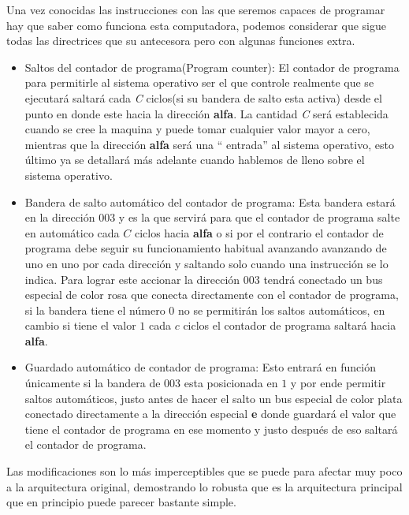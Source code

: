 \documentclass[12pt]{article}
\begin{document}
	Una vez conocidas las instrucciones con las que seremos capaces de programar hay que saber como funciona esta computadora, podemos
	considerar que sigue todas las directrices que su antecesora pero con algunas funciones extra.
	
	\begin{itemize}
		\item Saltos del contador de programa(Program counter):  
			El contador de programa para permitirle al sistema operativo ser el que controle realmente que se ejecutará saltará
			cada \textit{C} ciclos(si su bandera de salto esta activa) desde el punto en donde este hacia la dirección \textbf{alfa}.
			La cantidad \textit{C} será establecida cuando se cree la maquina y puede tomar cualquier valor mayor a cero, mientras
			que la dirección \textbf{alfa} será una `` entrada'' al sistema operativo, esto último ya se detallará más adelante
			cuando hablemos de lleno sobre el sistema operativo.
		
		\item Bandera de salto automático del contador de programa: 
			Esta bandera estará en la dirección $003$ y es la que servirá para que el contador de programa salte en automático cada $C$
			ciclos hacia \textbf{alfa} o si por el contrario el contador de programa debe seguir su funcionamiento habitual avanzando
			avanzando de uno en uno por cada dirección y saltando solo cuando una instrucción se lo indica. Para lograr este accionar
			la dirección $003$ tendrá conectado un bus especial de color rosa que conecta directamente con el contador de programa, si
			la bandera tiene el número $0$ no se permitirán los saltos automáticos, en cambio si tiene el valor $1$ cada $c$ ciclos el
			contador de programa saltará hacia \textbf{alfa}.
			
		\item Guardado automático de contador de programa:
			Esto entrará en función únicamente si la bandera de $003$ esta posicionada en $1$ y por ende permitir saltos automáticos,
			justo antes de hacer el salto un bus especial de color plata conectado directamente a la dirección especial \textbf{e} donde
			guardará el valor que tiene el contador de programa en ese momento y justo después de eso saltará el contador de programa.
			
	\end{itemize}
	
	Las modificaciones son lo más imperceptibles que se puede para afectar muy poco a la arquitectura original, demostrando
	lo robusta que es la arquitectura principal que en principio puede parecer bastante simple.
	
\end{document}
